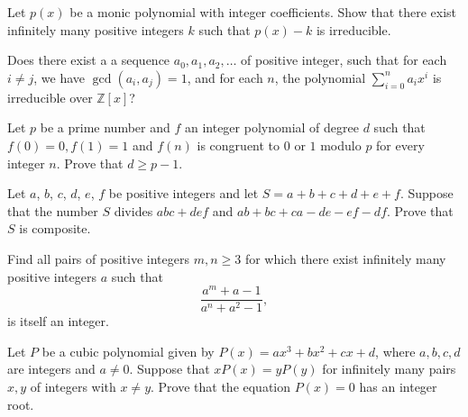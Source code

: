 \begin{question}[name={2007 MOP}]
    Let $p(x)$ be a monic polynomial with integer coefficients. Show that there exist infinitely many positive integers $k$ such that $p(x)-k$ is irreducible.
\end{question}


\begin{question}[name={2007 Iran TST}]
    Does there exist a a sequence $a_{0},a_{1},a_{2},\dots$ of positive integer, such that for each $i\neq j$, we have $\gcd(a_{i},a_{j})=1$, and for each $n$, the polynomial $\sum_{i=0}^{n}a_{i}x^{i}$ is irreducible over $\mathbb Z[x]$?
\end{question}


\begin{question}[name={1997 IMO Shortlist}]
    Let $ p$ be a prime number and $ f$ an integer polynomial of degree $ d$ such that $ f(0) = 0,f(1) = 1$ and $ f(n)$ is congruent to $ 0$ or $ 1$ modulo $ p$ for every integer $ n$. Prove that $ d\geq p - 1$.
\end{question}


\begin{question}[name={2005 IMO Shortlist}]
    Let $ a$, $ b$, $ c$, $ d$, $ e$, $ f$ be positive integers and let $ S = a+b+c+d+e+f$. Suppose that the number $ S$ divides $ abc+def$ and $ ab+bc+ca-de-ef-df$. Prove that $ S$ is composite.
\end{question}

\begin{question}[name={2002 IMO}]
    Find all pairs of positive integers $m,n\geq3$ for which there exist infinitely many positive integers $a$ such that\[ \frac{a^m+a-1}{a^n+a^2-1},  \] is itself an integer.
\end{question}

\begin{question}[name={2002 IMO Shortlist}]
    Let $P$ be a cubic polynomial given by $P(x)=ax^3+bx^2+cx+d$, where $a,b,c,d$ are integers and $a\ne0$. Suppose that $xP(x)=yP(y)$ for infinitely many pairs $x,y$ of integers with $x\ne y$. Prove that the equation $P(x)=0$ has an integer root.
\end{question}

